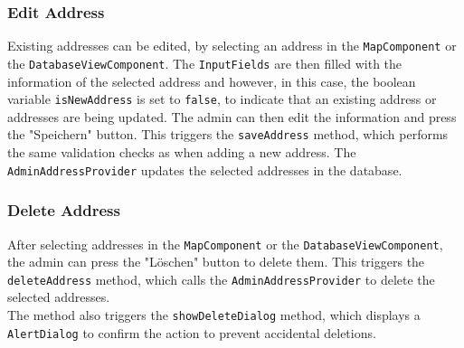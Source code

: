 
\subsubsection{Edit Address}
\sloppy %
Existing addresses can be edited, by selecting an address in the \texttt{MapComponent} or the \texttt{DatabaseViewComponent}. The \texttt{InputFields} are then filled with the information of the selected address and however, in this case, the boolean variable \texttt{isNewAddress} is set to \texttt{false}, to indicate that an existing address or addresses are being updated. The admin can then edit the information and press the "Speichern" button. This triggers the \texttt{saveAddress} method, which performs the same validation checks as when adding a new address. The \texttt{AdminAddressProvider} updates the selected addresses in the database.

\subsubsection{Delete Address}
After selecting addresses in the \texttt{MapComponent} or the \texttt{DatabaseViewComponent}, the admin can press the "Löschen" button to delete them. This triggers the \texttt{deleteAddress} method, which calls the \texttt{AdminAddressProvider} to delete the selected addresses.\\The method also triggers the \texttt{showDeleteDialog} method, which displays a \texttt{AlertDialog} to confirm the action to prevent accidental deletions.

